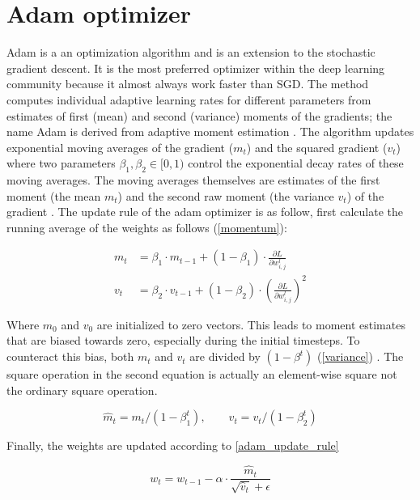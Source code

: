 \section{Adam optimizer}
Adam is a an optimization algorithm and is an extension to the stochastic gradient descent. It is the most preferred optimizer within the deep learning community because it almost always work faster than SGD. The method computes individual adaptive learning rates for different parameters from estimates of first (mean) and second (variance) moments of the gradients; the name Adam is derived from adaptive moment estimation \cite{adam}.
The algorithm updates exponential moving averages of the gradient ($m_t$) and the squared gradient ($v_t$) where two parameters $\beta_1, \beta_2 \in [0, 1)$ control the exponential decay rates of these moving averages. The moving averages themselves are estimates of the first moment (the mean $m_t$) and the second raw moment (the variance $v_t$) of the gradient \cite{adam}.
The update rule of the adam optimizer is as follow, first calculate the running average of the weights as follows (\cref{momentum}):

\begin{align}
  \label{momentum}
  m_t &= \beta_1 \cdot m_{t - 1} + (1 - \beta_1) \cdot \frac{\partial L}{\partial w_{i, j}^l} \\
  v_t &= \beta_2 \cdot v_{t - 1} + (1 - \beta_2) \cdot (\frac{\partial L}{\partial w_{i, j}^l})^2
\end{align}

Where $m_0$ and $v_0$ are initialized to zero vectors. This leads to moment estimates that are biased towards zero, especially during the initial timesteps. To counteract this bias, both  $m_t$ and $v_t$ are divided by $(1 - \beta^t)$ (\cref{variance}) \cite{adam}. The square operation in the second equation is actually an element-wise square not the ordinary square operation.

\begin{equation}
  \label{variance}
  \hat{m}_t = m_t / (1 - \beta_1^t), \qquad \hat{v}_t = v_t / (1 - \beta_2^t)
\end{equation}

Finally, the weights are updated according to \cref{adam_update_rule}

\begin{equation}
  \label{adam_update_rule}
  w_{t} = w_{t-1} - \alpha \cdot \frac{\hat{m}_t}{\sqrt{\hat{v}_t} + \epsilon}
\end{equation}

